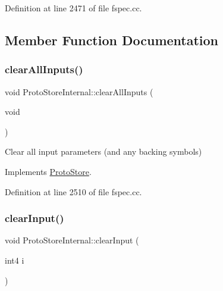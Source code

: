 Definition at line 2471 of file fspec.\+cc.



\subsection{Member Function Documentation}
\mbox{\label{class_proto_store_internal_a42caab4f3ba540a08e6c130f7e52a8ff}} 
\subsubsection{\texorpdfstring{clearAllInputs()}{clearAllInputs()}}
{\footnotesize\ttfamily void Proto\+Store\+Internal\+::clear\+All\+Inputs (\begin{DoxyParamCaption}\item[{void}]{ }\end{DoxyParamCaption})\hspace{0.3cm}{\ttfamily [virtual]}}



Clear all input parameters (and any backing symbols) 



Implements \mbox{\hyperlink{class_proto_store_a2b2eab8f123a06bb4f4619e039bb1106}{Proto\+Store}}.



Definition at line 2510 of file fspec.\+cc.

\mbox{\label{class_proto_store_internal_ae3948caba06771c1df6dea3af57d55c1}} 
\subsubsection{\texorpdfstring{clearInput()}{clearInput()}}
{\footnotesize\ttfamily void Proto\+Store\+Internal\+::clear\+Input (\begin{DoxyParamCaption}\item[{int4}]{i }\end{DoxyParamCaption})\hspace{0.3cm}{\ttfamily [virtual]}}



